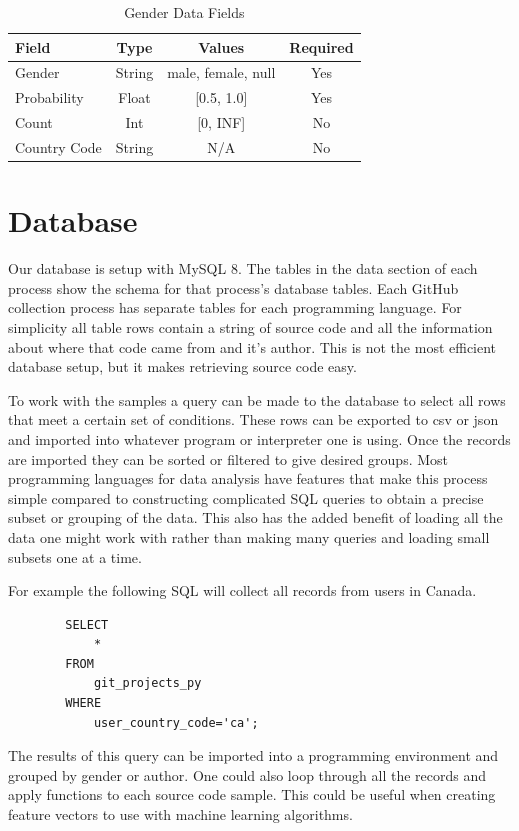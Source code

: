 \documentclass[12pt]{article}
\begin{document}
\begin{table}[t]
    \begin{center}
        \caption{Gender Data Fields}
        \label{tab:gen_data}
        \begin{tabular}{| l |c | c | c |}
            \hline
            \textbf{Field} & \textbf{Type} & \textbf{Values} & \textbf{Required}\\
            \hline
            Gender & String & {male, female, null} & Yes\\
            Probability & Float & [0.5, 1.0] & Yes\\ 
            Count & Int & [0, INF] & No\\
            Country Code & String & N/A & No\\
            \hline
        \end{tabular}
    \end{center}
\end{table}


\section{Database}
Our database is setup with MySQL 8. The tables in the data section of each process show the schema for that process's database tables. Each GitHub collection process has separate tables for each programming language. For simplicity all table rows contain a string of source code and all the information about where that code came from and it's author. This is not the most efficient database setup, but it makes retrieving source code easy.

To work with the samples a query can be made to the database to select all rows that meet a certain set of conditions. These rows can be exported to csv or json and imported into whatever program or interpreter one is using. Once the records are imported they can be sorted or filtered to give desired groups. Most programming languages for data analysis have features that make this process simple compared to constructing complicated SQL queries to obtain a precise subset or grouping of the data. This also has the added benefit of loading all the data one might work with rather than making many queries and loading small subsets one at a time.

For example the following SQL will collect all records from users in Canada.

\begin{singlespacing}
    \begin{verbatim}
        SELECT
            *
        FROM
            git_projects_py
        WHERE
            user_country_code='ca';
    \end{verbatim}
\end{singlespacing}
The results of this query can be imported into a programming environment and grouped by gender or author. One could also loop through all the records and apply functions to each source code sample. This could be useful when creating feature vectors to use with machine learning algorithms.
\end{document}
